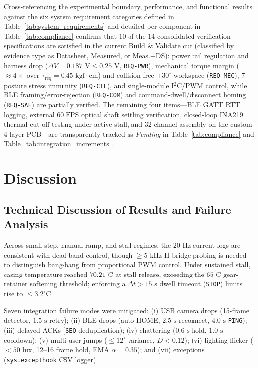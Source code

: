 \documentclass[lettersize,journal]{IEEEtran}
\begin{document}
	Cross-referencing the experimental boundary, performance, and functional results against the six system requirement categories defined in Table~\ref{tab:system_requirements} and detailed per component in Table~\ref{tab:compliance} confirms that $10$ of the $14$ consolidated verification specifications are satisfied in the current Build \& Validate cut (classified by evidence type as Datasheet, Measured, or Meas.+DS): power rail regulation and harness drop ($\Delta V = 0.187\text{ V} \le 0.25\text{ V}$, \texttt{REQ-PWR}), mechanical torque margin ($\approx 4\times$ over $\tau_{\text{req}} = 0.45\text{ kgf}\cdot\text{cm}$) and collision-free $\pm 30^\circ$ workspace (\texttt{REQ-MEC}), 7-posture stress immunity (\texttt{REQ-CTL}), and single-module I$^2$C/PWM control, while BLE framing/error-rejection (\texttt{REQ-COM}) and command-dwell/disconnect homing (\texttt{REQ-SAF}) are partially verified. The remaining four items—BLE GATT RTT logging, external $60\text{ FPS}$ optical shaft settling verification, closed-loop INA219 thermal cut-off testing under active stall, and 32-channel assembly on the custom 4-layer PCB—are transparently tracked as \textit{Pending} in Table~\ref{tab:compliance} and Table~\ref{tab:integration_increments}.
	
	\section{Discussion}
	\label{sec:discussion}
	
	\subsection{Technical Discussion of Results and Failure Analysis}
	\label{sec:disc_technical}
	
	Across small-step, manual-ramp, and stall regimes, the $20\text{ Hz}$ current logs are consistent with dead-band control, though $\ge 5\text{ kHz}$ H-bridge probing is needed to distinguish bang-bang from proportional PWM control. Under sustained stall, casing temperature reached $70.21^\circ\text{C}$ at stall release, exceeding the $65^\circ\text{C}$ gear-retainer softening threshold; enforcing a $\Delta t > 15\text{ s}$ dwell timeout (\texttt{STOP}) limits rise to $\le 3.2^\circ\text{C}$.
	
	Seven integration failure modes were mitigated: (i) USB camera drops (15-frame detector, $1.5\text{ s}$ retry); (ii) BLE drops (auto-HOME, $2.5\text{ s}$ reconnect, $4.0\text{ s}$ \texttt{PING}); (iii) delayed ACKs (\texttt{SEQ} deduplication); (iv) chattering ($0.6\text{ s}$ hold, $1.0\text{ s}$ cooldown); (v) multi-user jumps ($\le 12^\circ$ variance, $D < 0.12$); (vi) lighting flicker ($<50\text{ lux}$, 12--16 frame hold, EMA $\alpha = 0.35$); and (vii) exceptions (\texttt{sys.excepthook} CSV logger).
	
\end{document}
